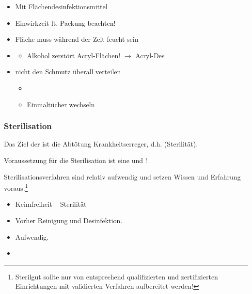 {


\begin{itemize}
    \item Mit Flächendesinfektionsmittel 
    \item Einwirkzeit lt. Packung beachten!
    \item Fläche muss während der Zeit feucht sein
    \item {}
    \begin{itemize}
        \item Alkohol zerstört Acryl-Flächen! ${\rightarrow}$
        Acryl-Des{\texttrademark}
    \end{itemize}
    \item nicht den Schmutz überall verteilen
    \begin{itemize}
        \item {}
        \item Einmaltücher wechseln
    \end{itemize}
\end{itemize}

}{
	
}{}{}{}

\subsubsection{Sterilisation}
{
Das Ziel der  ist die Abtötung 
Krankheitserreger, d.h.  (Sterilität). 

Voraussetzung für die Sterilisation ist eine  und
! 


Sterilisationsverfahren sind relativ aufwendig und setzen Wissen und Erfahrung
voraus.\footnote{Sterilgut sollte nur von entsprechend qualifizierten und
zertifizierten Einrichtungen mit validierten Verfahren aufbereitet werden!}
}{
\begin{itemize}
  \item Keimfreiheit -- Sterilität
  \item Vorher Reinigung und Desinfektion.
  \item Aufwendig.
  \item {}
\end{itemize}
}{}{}{}

